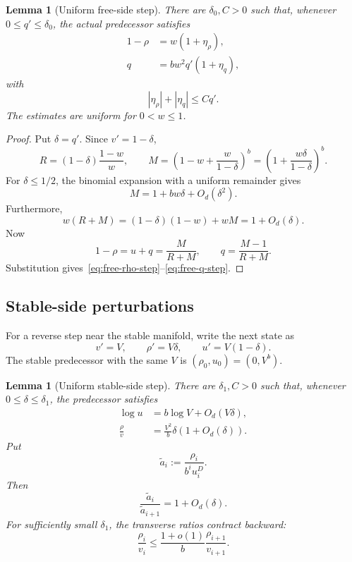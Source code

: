 \documentclass[11pt]{amsart}
\newtheorem{lemma}[theorem]{Lemma}
\theoremstyle{definition}
\begin{document}
\begin{lemma}[Uniform free-side step]\label{lem:free-step}
There are $\delta_0,C>0$ such that, whenever $0\le q'\le\delta_0$, the actual predecessor satisfies
\begin{align}
 1-\rho&=w(1+\eta_\rho),\label{eq:free-rho-step}\\
 q&=bw^2q'(1+\eta_q),\label{eq:free-q-step}
\end{align}
with
\[
 |\eta_\rho|+|\eta_q|\le Cq'.
\]
The estimates are uniform for $0<w\le1$.
\end{lemma}

\begin{proof}
Put $\delta=q'$.  Since $v'=1-\delta$,
\[
 R=(1-\delta)\frac{1-w}{w},
 \qquad
 M=\left(1-w+\frac w{1-\delta}\right)^b
 =\left(1+\frac{w\delta}{1-\delta}\right)^b.
\]
For $\delta\le1/2$, the binomial expansion with a uniform remainder gives
\[
 M=1+bw\delta+O_d(\delta^2).
\]
Furthermore,
\[
 w(R+M)
 =(1-\delta)(1-w)+wM
 =1+O_d(\delta).
\]
Now
\[
 1-\rho=u+q=\frac M{R+M},
 \qquad
 q=\frac{M-1}{R+M}.
\]
Substitution gives~\eqref{eq:free-rho-step}--\eqref{eq:free-q-step}.
\end{proof}

\subsection{Stable-side perturbations}
For a reverse step near the stable manifold, write the next state as
\[
 v'=V,
 \qquad
 \rho'=V\delta,
 \qquad
 u'=V(1-\delta).
\]
The stable predecessor with the same $V$ is $(\rho_0,u_0)=(0,V^b)$.

\begin{lemma}[Uniform stable-side step]\label{lem:stable-step}
There are $\delta_1,C>0$ such that, whenever $0\le\delta\le\delta_1$, the predecessor satisfies
\begin{align}
 \log u&=b\log V+O_d(V\delta),\label{eq:stable-logu}\\
 \frac\rho v&=\frac{V^2}{b}\delta(1+O_d(\delta)).\label{eq:stable-delta}
\end{align}
Put
\[
 \widetilde a_i:=\frac{\rho_i}{b^iu_i^D}.
\]
Then
\begin{equation}\label{eq:stable-invariant-step}
 \frac{\widetilde a_i}{\widetilde a_{i+1}}
 =1+O_d(\delta).
\end{equation}
For sufficiently small $\delta_1$, the transverse ratios contract backward:
\[
 \frac{\rho_i}{v_i}\le\frac{1+o(1)}b\frac{\rho_{i+1}}{v_{i+1}}.
\]
\end{lemma}
\end{document}
